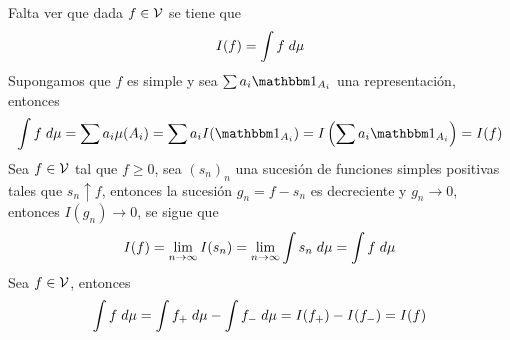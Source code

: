 \documentclass{article}
\begin{document}
\begin{enumerate}
    \vspace{4mm}
    \noindent Falta ver que dada $f\in\mathcal{V}$ se tiene que
    \begin{equation*}
        I(f)=\int f\hspace{1mm}d\mu
    \end{equation*}
    Supongamos que $f$ es simple y sea $\sum a_{i}\I_{A_{i}}$ una representación, entonces
    \begin{equation*}
        \int f\hspace{1mm}d\mu=\sum a_{i}\mu(A_{i})=\sum a_{i}I(\I_{A_{i}})
        =I\left(\sum a_{i}\I_{A_{i}}\right)=I(f)
    \end{equation*}
    Sea $f\in\mathcal{V}$ tal que $f\geq0$, sea $(s_{n})_{n}$ una sucesión de funciones simples positivas
    tales que $s_{n}\uparrow f$, entonces la sucesión $g_{n}=f-s_{n}$ es decreciente y 
    $g_{n}\to0$, entonces $I(g_{n})\to0$, se sigue que
    \begin{equation*}
        I(f)=\lim\limits_{n\to\infty}I(s_{n})=\lim\limits_{n\to\infty}\int s_{n}\hspace{1mm}d\mu
        =\int f\hspace{1mm}d\mu
    \end{equation*}
    Sea $f\in\mathcal{V}$, entonces
    \begin{equation*}
        \int f\hspace{1mm}d\mu=\int f_{+}\hspace{1mm}d\mu-\int f_{-}\hspace{1mm}d\mu
        =I(f_{+})-I(f_{-})=I(f)
    \end{equation*}
\end{enumerate}

\end{document}
